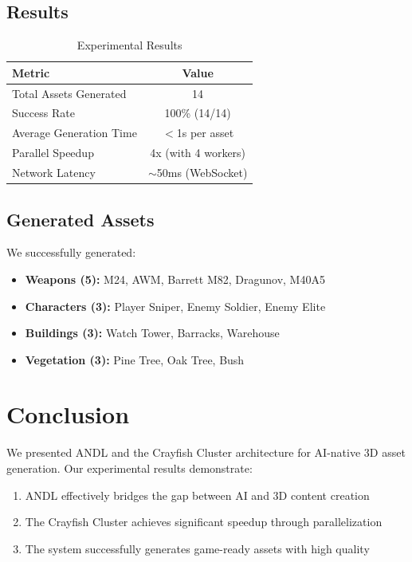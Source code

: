 \documentclass[11pt,a4paper]{article}
\begin{document}
\subsection{Results}
\begin{table}[h]
\centering
\begin{tabular}{lc}
\toprule
\textbf{Metric} & \textbf{Value} \\
\midrule
Total Assets Generated & 14 \\
Success Rate & 100\% (14/14) \\
Average Generation Time & $<$1s per asset \\
Parallel Speedup & 4x (with 4 workers) \\
Network Latency & $\sim$50ms (WebSocket) \\
\bottomrule
\end{tabular}
\caption{Experimental Results}
\end{table}

\subsection{Generated Assets}
We successfully generated:
\begin{itemize}
    \item \textbf{Weapons (5):} M24, AWM, Barrett M82, Dragunov, M40A5
    \item \textbf{Characters (3):} Player Sniper, Enemy Soldier, Enemy Elite
    \item \textbf{Buildings (3):} Watch Tower, Barracks, Warehouse
    \item \textbf{Vegetation (3):} Pine Tree, Oak Tree, Bush
\end{itemize}

\section{Conclusion}
We presented ANDL and the Crayfish Cluster architecture for AI-native 3D asset generation. Our experimental results demonstrate:
\begin{enumerate}
    \item ANDL effectively bridges the gap between AI and 3D content creation
    \item The Crayfish Cluster achieves significant speedup through parallelization
    \item The system successfully generates game-ready assets with high quality
\end{enumerate}
\end{document}
